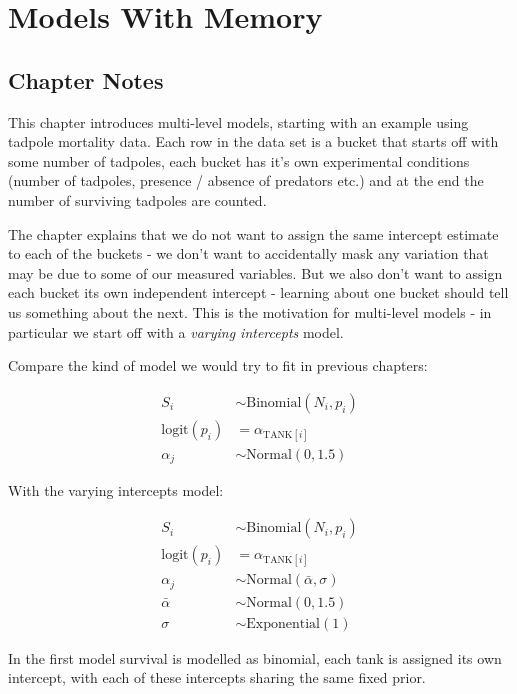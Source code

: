 \documentclass[
]{book}
\begin{document}
\hypertarget{models_memory}{%
\chapter{Models With Memory}\label{models_memory}}

\hypertarget{chapter-notes-12}{%
\section{Chapter Notes}\label{chapter-notes-12}}

This chapter introduces multi-level models, starting with an example using tadpole mortality data. Each row in the data set is a bucket that starts off with some number of tadpoles, each bucket has it's own experimental conditions (number of tadpoles, presence / absence of predators etc.) and at the end the number of surviving tadpoles are counted.

The chapter explains that we do not want to assign the same intercept estimate to each of the buckets - we don't want to accidentally mask any variation that may be due to some of our measured variables. But we also don't want to assign each bucket its own independent intercept - learning about one bucket should tell us something about the next. This is the motivation for multi-level models - in particular we start off with a \emph{varying intercepts} model.

Compare the kind of model we would try to fit in previous chapters:

\[
\begin{aligned}
S_i &\sim \text{Binomial}(N_i,p_i) \\
\text{logit}(p_i) &= \alpha_{\text{TANK}[i]} \\
\alpha_j &\sim \text{Normal}(0,1.5)
\end{aligned}
\]

With the varying intercepts model:

\[
\begin{aligned}
S_i &\sim \text{Binomial}(N_i,p_i) \\
\text{logit}(p_i) &= \alpha_{\text{TANK}[i]} \\
\alpha_j &\sim \text{Normal}(\bar{\alpha},\sigma) \\
\bar{\alpha} & \sim \text{Normal}(0,1.5) \\
\sigma &\sim \text{Exponential}(1)
\end{aligned}
\]

In the first model survival is modelled as binomial, each tank is assigned its own intercept, with each of these intercepts sharing the same fixed prior.
\end{document}
